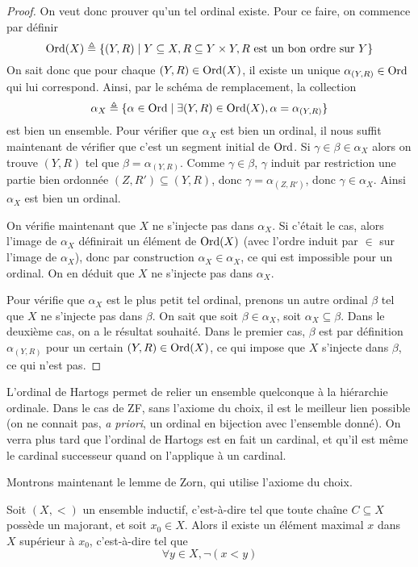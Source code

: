 \begin{proof}
  On veut donc prouver qu'un tel ordinal existe. Pour ce faire, on commence par
  définir
  \[\operatorname{Ord}(X) \triangleq \{(Y,R)\mid
  Y\subseteq X, R\subseteq Y\times Y, R\text{ est un bon ordre sur }Y\}\]
  On sait donc que pour chaque $(Y,R)\in\operatorname{Ord}(X)$, il existe un unique
  $\alpha_{(Y,R)}\in\operatorname{Ord}$ qui lui correspond. Ainsi, par le schéma de
  remplacement, la collection
  \[\alpha_X \triangleq \{\alpha \in \operatorname{Ord}\mid \exists (Y,R) \in \operatorname{Ord}(X),
  \alpha = \alpha_{(Y,R)}\}\]
  est bien un ensemble. Pour vérifier que $\alpha_X$ est bien un ordinal, il
  nous suffit maintenant de vérifier que c'est un segment initial de $\operatorname{Ord}$.
  Si $\gamma\in\beta\in\alpha_X$ alors on trouve $(Y,R)$ tel que
  $\beta = \alpha_{(Y,R)}$. Comme $\gamma\in\beta$, $\gamma$ induit
  par restriction une partie bien ordonnée $(Z,R')\subseteq (Y,R)$, donc
  $\gamma = \alpha_{(Z,R')}$, donc $\gamma\in \alpha_X$. Ainsi $\alpha_X$ est
  bien un ordinal.

  On vérifie maintenant que $X$ ne s'injecte pas dans $\alpha_X$. Si c'était le
  cas, alors l'image de $\alpha_X$ définirait un élément de $\operatorname{Ord}(X)$ (avec
  l'ordre induit par $\in$ sur l'image de $\alpha_X$), donc par construction
  $\alpha_X\in\alpha_X$, ce qui est impossible pour un ordinal. On en déduit
  que $X$ ne s'injecte pas dans $\alpha_X$.

  Pour vérifie que $\alpha_X$ est le plus petit tel ordinal, prenons un autre
  ordinal $\beta$ tel que $X$ ne s'injecte pas dans $\beta$. On sait que
  soit $\beta \in \alpha_X$, soit $\alpha_X\subseteq \beta$. Dans le deuxième
  cas, on a le résultat souhaité. Dans le premier cas, $\beta$ est par
  définition $\alpha_{(Y,R)}$ pour un certain $(Y,R)\in\operatorname{Ord}(X)$, ce qui impose
  que $X$ s'injecte dans $\beta$, ce qui n'est pas.
\end{proof}

L'ordinal de Hartogs permet de relier un ensemble quelconque à la hiérarchie
ordinale. Dans le cas de ZF, sans l'axiome du choix, il est le meilleur lien
possible (on ne connait pas, \textit{a priori}, un ordinal en bijection avec
l'ensemble donné). On verra plus tard que l'ordinal de Hartogs est en fait un
cardinal, et qu'il est même le cardinal successeur quand on l'applique à un
cardinal.

Montrons maintenant le lemme de Zorn, qui utilise l'axiome du choix.

\begin{theorem}
  Soit $(X,<)$ un ensemble inductif, c'est-à-dire tel que toute chaîne
  $C\subseteq X$ possède un majorant, et soit $x_0\in X$. Alors il existe un
  élément maximal $x$ dans $X$ supérieur à $x_0$, c'est-à-dire tel que
  \[\forall y \in X, \lnot (x < y)\]
\end{theorem}

